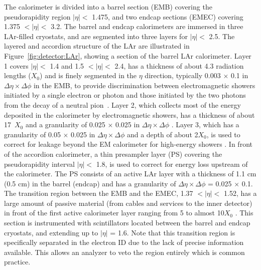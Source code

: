 The calorimeter is divided into a barrel section (EMB) covering the pseudorapidity region $|\eta|<$ 1.475, and two endcap sections (EMEC) covering 1.375 $<|\eta|<$ 3.2.
The barrel and endcap calorimeters are immersed in three LAr-filled cryostats, and are segmented into three layers for $|\eta|<$ 2.5.
The layered and accordion structure of the LAr are illustrated in Figure~\ref{fig:detector:LAr}, showing a section of the barrel LAr calorimeter.
Layer 1 covers $|\eta|<$  1.4 and 1.5 $<|\eta|<$ 2.4, has a thickness of about 4.3 radiation lengths ($X_{0}$) and is finely segmented in the $\eta$ direction, typically 0.003 $\times$ 0.1 in $\Delta \eta \times \Delta \phi$ in the EMB, to provide discrimination between electromagnetic showers initiated by a single electron or photon and those initiated by the two photons from the decay of a neutral pion~\cite{PERF-2007-01}.
Layer 2, which collects most of the energy deposited in the calorimeter by electromagnetic showers, has a thickness of about 17~$X_{0}$ and a granularity of 0.025 $\times$ 0.025 in $\Delta \eta \times \Delta \phi$ \cite{PERF-2007-01}.
Layer 3, which has a granularity of 0.05 $\times$ 0.025 in $\Delta \eta \times \Delta \phi$ and a depth of about 2$X_{0}$, is used to correct for leakage beyond the EM calorimeter for high-energy showers \cite{PERF-2007-01}.
In front of the accordion calorimeter, a thin presampler layer (PS) covering the pseudorapidity interval $|\eta|<$ 1.8, is used to correct for energy loss upstream of the calorimeter.
The PS consists of an active LAr layer with a thickness of 1.1 cm (0.5 cm) in the barrel (endcap) and has a granularity of $\Delta \eta \times \Delta \phi$ = 0.025 $\times$ 0.1.
The transition region between the EMB and the EMEC, 1.37 $<|\eta|<$ 1.52, has a large amount of passive material (from cables and services to the inner detector) in front of the first active calorimeter layer ranging from 5 to almost 10$X_{0}$ \cite{PERF-2007-01}.
This section is instrumented with scintillators located between the barrel and endcap cryostats, and extending up to $|\eta|$ = 1.6.
Note that this transition region is specifically separated in the electron ID due to the lack of precise information available. 
This allows an analyzer to veto the region entirely which is common practice. 

